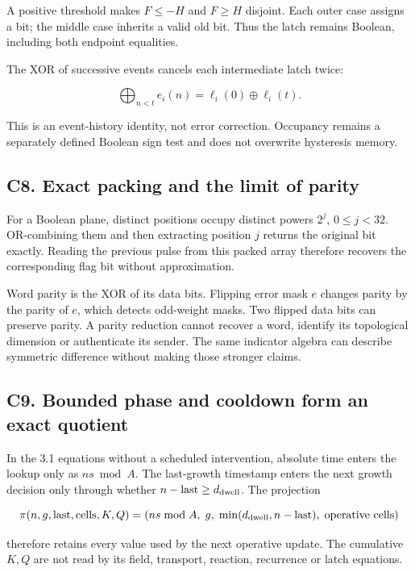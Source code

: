 \documentclass[11pt,a4paper]{article}
\begin{document}
A positive threshold makes \(F\le-H\) and \(F\ge H\) disjoint. Each
outer case assigns a bit; the middle case inherits a valid old bit. Thus
the latch remains Boolean, including both endpoint equalities.

The XOR of successive events cancels each intermediate latch twice:

\[
\bigoplus_{n<t}e_i(n)=\ell_i(0)\oplus\ell_i(t).
\]

This is an event-history identity, not error correction. Occupancy
remains a separately defined Boolean sign test and does not overwrite
hysteresis memory.

\subsection{C8. Exact packing and the limit of
parity}\label{c8.-exact-packing-and-the-limit-of-parity}

For a Boolean plane, distinct positions occupy distinct powers \(2^j\),
\(0\le j<32\). OR-combining them and then extracting position \(j\)
returns the original bit exactly. Reading the previous pulse from this
packed array therefore recovers the corresponding flag bit without
approximation.

Word parity is the XOR of its data bits. Flipping error mask \(e\)
changes parity by the parity of \(e\), which detects odd-weight masks.
Two flipped data bits can preserve parity. A parity reduction cannot
recover a word, identify its topological dimension or authenticate its
sender. The same indicator algebra can describe symmetric difference
without making those stronger claims.

\subsection{C9. Bounded phase and cooldown form an exact
quotient}\label{c9.-bounded-phase-and-cooldown-form-an-exact-quotient}

In the 3.1 equations without a scheduled intervention, absolute time
enters the lookup only as \(ns\bmod A\). The last-growth timestamp
enters the next growth decision only through whether
\(n-\text{last}\ge d_{\rm dwell}\). The projection

\[
\pi(n,g,\text{last},\text{cells},K,Q)=
(ns\bmod A,\;g,\;\min(d_{\rm dwell},n-\text{last}),\;\text{operative cells})
\]

therefore retains every value used by the next operative update. The
cumulative \(K,Q\) are not read by its field, transport, reaction,
recurrence or latch equations.
\end{document}
